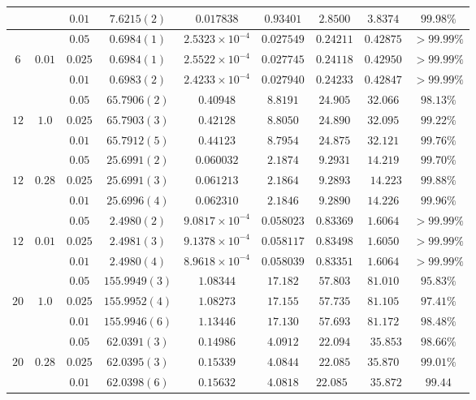 \documentclass[a4paper,10pt,twocolumn]{article} %
\begin{document}
\begin{table*}[ht!]
\begin{center}
\begin{tabular}{|c|c|c|c|c|c|c|c|c|}
 	 & 			& $0.01$  & $7.6215(2)$ & $0.017838$ & $0.93401$ & $2.8500$ & $3.8374$ & $99.98\%$\\ 
\hline
     &      	& $0.05$   & $0.6984(1)$ & $2.5323\times10^{-4}$ & $0.027549$ & $0.24211$ & $0.42875$ & $>99.99\%$\\ 
 $6$ & $0.01$	& $0.025$  & $0.6984(1)$ & $2.5522\times10^{-4}$ & $0.027745$ & $0.24118$ & $0.42950$ & $>99.99\%$\\ 
 	 & 			& $0.01$   & $0.6983(2)$ & $2.4233\times10^{-4}$ & $0.027940$ & $0.24233$ & $0.42847$ & $>99.99\%$\\ 
\hline
\hline
 	 & 			& $0.05$  & $65.7906(2)$ & $0.40948$ & $8.8191$ & $24.905$ & $32.066$ & $98.13\%$\\ 
 $12$& $1.0$ 	& $0.025$ & $65.7903(3)$ & $0.42128$ & $8.8050$ & $24.890$ & $32.095$ & $99.22\%$\\ 
 	 & 			& $0.01$  & $65.7912(5)$ & $0.44123$ & $8.7954$ & $24.875$ & $32.121$ & $99.76\%$\\ 
\hline
 	 & 	 		& $0.05$  & $25.6991(2)$ & $0.060032$ & $2.1874$ & $9.2931$ & $14.219$ &$99.70\%$\\ 
 $12$& 	$0.28$	& $0.025$ & $25.6991(3)$ & $0.061213$ & $2.1864$ & $9.2893$ & $14.223$ &$99.88\%$\\ 
 	 & 			& $0.01$  & $25.6996(4)$ & $0.062310$ & $2.1846$ & $9.2890$ & $14.226$ &$99.96\%$\\ 
\hline
 	  & 		& $0.05$  & $2.4980(2)$ & $9.0817\times10^{-4}$ & $0.058023$ & $0.83369$ & $1.6064$ & $>99.99\%$\\ 
 $12$ & $0.01$	& $0.025$ & $2.4981(3)$ & $9.1378\times10^{-4}$ & $0.058117$ & $0.83498$ & $1.6050$ & $>99.99\%$\\ 
 	  & 		& $0.01$  & $2.4980(4)$ & $8.9618\times10^{-4}$ & $0.058039$ & $0.83351$ & $1.6064$ & $>99.99\%$\\ 
\hline
\hline
	& 	 	& $0.05$  & $155.9949(3)$ & $1.08344$ & $17.182$ & $57.803$ & $81.010$ &$95.83\%$\\ 
$20$& $1.0$	& $0.025$ & $155.9952(4)$ & $1.08273$ & $17.155$ & $57.735$ & $81.105$ &$97.41\%$\\ 
 	&  		& $0.01$  & $155.9946(6)$ & $1.13446$ & $17.130$ & $57.693$ & $81.172$ &$98.48\%$\\ 
\hline
	& 		& $0.05$   & $62.0391(3)$ & $0.14986$ & $4.0912$ & $22.094$ & $35.853$ & $98.66\%$\\ 
$20$& $0.28$& $0.025$  & $62.0395(3)$ & $0.15339$ & $4.0844$ & $22.085$ & $35.870$ & $99.01\%$\\ 	
	& 	 	& $0.01$   & $62.0398(6)$ & $0.15632$ & $4.0818$ & $22.085$ & $35.872$ & $99.44$\\ 

\end{tabular}
\end{center}
\end{table*}
\end{document}
